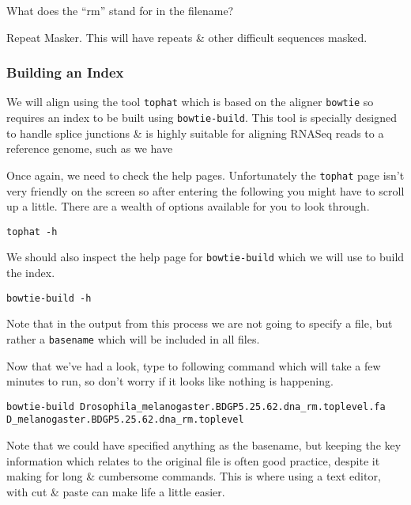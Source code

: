 \begin{questions}
What does the ``rm'' stand for in the filename?\\
\begin{answer}
Repeat Masker. This will have repeats \& other difficult sequences masked.
\end{answer}
\end{questions}

\subsubsection{Building an Index}
We will align using the tool \texttt{tophat} which is based on the aligner \texttt{bowtie} so requires an index to be built using \texttt{bowtie-build}. 
This tool is specially designed to handle splice junctions \& is highly suitable for aligning RNASeq reads to a reference genome, such as we have\\

\begin{steps}
Once again, we need to check the help pages.
Unfortunately the \texttt{tophat} page isn't very friendly on the screen so after entering the following you might have to scroll up a little.
There are a wealth of options available for you to look through.\\
\begin{lstlisting}
tophat -h
\end{lstlisting}

We should also inspect the help page for \texttt{bowtie-build} which we will use to build the index.\\
\begin{lstlisting}
bowtie-build -h
\end{lstlisting}
Note that in the output from this process we are not going to specify a file, but rather a \texttt{basename} which will be included in all files.
\end{steps}

\begin{steps}
Now that we've had a look, type to following command which will take a few minutes to run, so don't worry if it looks like nothing is happening.
\begin{lstlisting}
bowtie-build Drosophila_melanogaster.BDGP5.25.62.dna_rm.toplevel.fa D_melanogaster.BDGP5.25.62.dna_rm.toplevel
\end{lstlisting}
Note that we could have specified anything as the basename, but keeping the key information which relates to the original file is often good practice, despite it making for long \& cumbersome commands.
This is where using a text editor, with cut \& paste can make life a little easier.
\end{steps}

